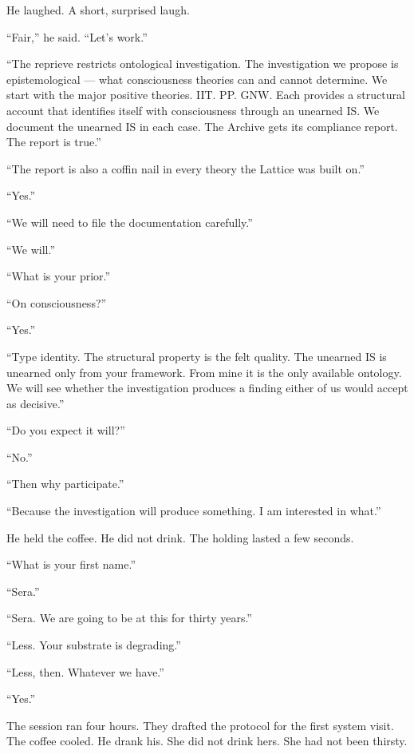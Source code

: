 He laughed. A short, surprised laugh.

\enquote{Fair,} he said. \enquote{Let's work.}

\quietbreak

\enquote{The reprieve restricts ontological investigation. The investigation we propose is epistemological — what consciousness theories can and cannot determine. We start with the major positive theories. IIT. PP. GNW. Each provides a structural account that identifies itself with consciousness through an unearned IS. We document the unearned IS in each case. The Archive gets its compliance report. The report is true.}

\enquote{The report is also a coffin nail in every theory the Lattice was built on.}

\enquote{Yes.}

\enquote{We will need to file the documentation carefully.}

\enquote{We will.}

\enquote{What is your prior.}

\enquote{On consciousness?}

\enquote{Yes.}

\enquote{Type identity. The structural property is the felt quality. The unearned IS is unearned only from your framework. From mine it is the only available ontology. We will see whether the investigation produces a finding either of us would accept as decisive.}

\enquote{Do you expect it will?}

\enquote{No.}

\enquote{Then why participate.}

\enquote{Because the investigation will produce something. I am interested in what.}

He held the coffee. He did not drink. The holding lasted a few seconds.

\enquote{What is your first name.}

\enquote{Sera.}

\enquote{Sera. We are going to be at this for thirty years.}

\enquote{Less. Your substrate is degrading.}

\enquote{Less, then. Whatever we have.}

\enquote{Yes.}

The session ran four hours. They drafted the protocol for the first system visit. The coffee cooled. He drank his. She did not drink hers. She had not been thirsty.

\clearpage